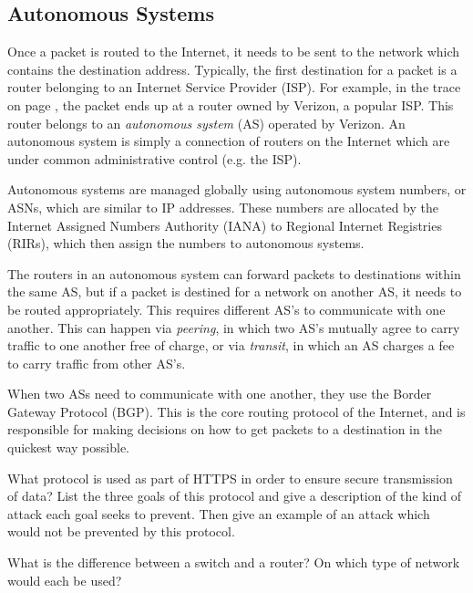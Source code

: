 \subsection{Autonomous Systems}

Once a packet is routed to the Internet, it needs to be sent to the network which contains the destination address. Typically, the first destination for a packet is a router belonging to an Internet Service Provider (ISP). For example, in the  trace on page \pageref{code:traceroute}, the packet ends up at a router owned by Verizon, a popular ISP. This router belongs to an \emph{autonomous system} (AS) operated by Verizon. An autonomous system is simply a connection of routers on the Internet which are under common administrative control (e.g. the ISP).

Autonomous systems are managed globally using autonomous system numbers, or ASNs, which are similar to IP addresses. These numbers are allocated by the Internet Assigned Numbers Authority (IANA) to Regional Internet Registries (RIRs), which then assign the numbers to autonomous systems.

The routers in an autonomous system can forward packets to destinations within the same AS, but if a packet is destined for a network on another AS, it needs to be routed appropriately. This requires different AS's to communicate with one another. This can happen via \emph{peering}, in which two AS's mutually agree to carry traffic to one another free of charge, or via \emph{transit}, in which an AS charges a fee to carry traffic from other AS's.

When two ASs need to communicate with one another, they use the Border Gateway Protocol (BGP). This is the core routing protocol of the Internet, and is responsible for making decisions on how to get packets to a destination in the quickest way possible. 

\exercisesection

\begin{exercise}
    What protocol is used as part of HTTPS in order to ensure secure transmission of data? List the three goals of this protocol and give a description of the kind of attack each goal seeks to prevent. Then give an example of an attack which would not be prevented by this protocol.
\end{exercise}

\begin{exercise}
    What is the difference between a switch and a router? On which type of network would each be used?
\end{exercise}

